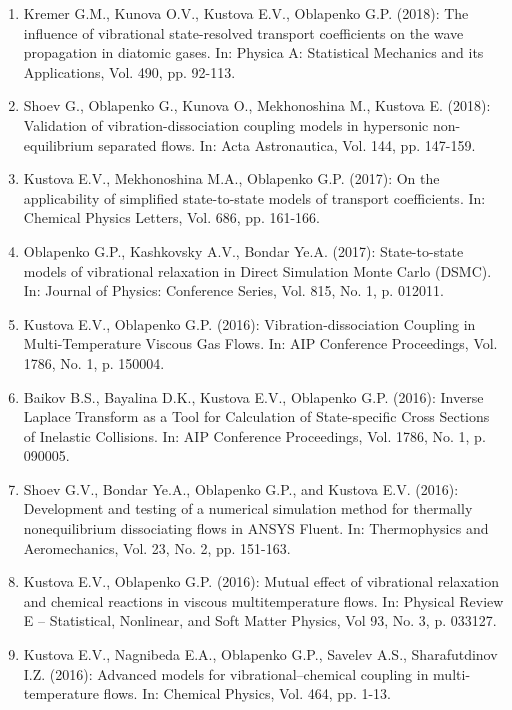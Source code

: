 \documentclass{resume} %
\begin{document}
\begin{enumerate}
\item {Kremer G.M., Kunova O.V., Kustova E.V., {Oblapenko G.P.}} (2018): The influence of vibrational state-resolved transport coefficients on the wave propagation in diatomic gases. In: Physica A: Statistical Mechanics and its Applications, Vol. 490, pp. 92-113.

\item {Shoev G., {Oblapenko G.}, Kunova O., Mekhonoshina M., Kustova E.} (2018): Validation of vibration-dissociation coupling models in hypersonic non-equilibrium separated flows. In: Acta Astronautica, Vol. 144, pp. 147-159.

\item {Kustova E.V., Mekhonoshina M.A., {Oblapenko G.P.}} (2017): On the applicability of simplified state-to-state models of transport coefficients. In: Chemical Physics Letters, Vol. 686, pp. 161-166.

\item {{Oblapenko G.P.}, Kashkovsky A.V., Bondar Ye.A.} (2017): State-to-state models of vibrational relaxation in Direct Simulation Monte Carlo (DSMC). In: Journal of Physics: Conference Series, Vol. 815, No. 1, p. 012011.

\item  {Kustova E.V., {Oblapenko G.P.}} (2016): Vibration-dissociation Coupling in Multi-Temperature Viscous Gas Flows. In: AIP Conference Proceedings, Vol. 1786, No. 1, p. 150004.

\item  {Baikov B.S., Bayalina D.K., Kustova E.V., {Oblapenko G.P.}} (2016): Inverse Laplace Transform as a Tool for Calculation of State-specific Cross Sections of Inelastic Collisions. In: AIP Conference Proceedings, Vol. 1786, No. 1, p. 090005.

\item  {Shoev G.V., Bondar Ye.A., {Oblapenko G.P.}, and Kustova E.V.} (2016): Development and testing of a numerical simulation method for thermally nonequilibrium dissociating flows in ANSYS Fluent. In: Thermophysics and Aeromechanics, Vol. 23, No. 2, pp. 151-163.

\item {Kustova E.V., {Oblapenko G.P.}} (2016): Mutual effect of vibrational relaxation and chemical reactions in viscous multitemperature flows. In: Physical Review E -- Statistical, Nonlinear, and Soft Matter Physics, Vol 93, No. 3, p. 033127.

\item  {Kustova E.V., Nagnibeda E.A., {Oblapenko G.P.}, Savelev A.S., Sharafutdinov I.Z.} (2016): Advanced models for vibrational–chemical coupling in multi-temperature flows. In: Chemical Physics, Vol. 464, pp. 1-13.


\end{enumerate}
\end{document}
